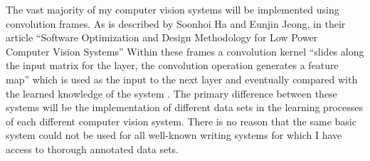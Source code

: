 \documentclass[12pt]{article}
\begin{document}
The vast majority of my computer vision systems will be implemented using convolution frames. As is described by Soonhoi Ha and Eunjin Jeong, in their article “Software Optimization and Design Methodology for Low Power Computer Vision Systems” Within these frames a convolution kernel “slides along the input matrix for the layer, the convolution operation generates a feature map” which is used as the input to the next layer and eventually compared with the learned knowledge of the system \cite{10.1145/3687310}. The primary difference between these systems will be the implementation of different data sets in the learning processes of each different computer vision system. There is no reason that the same basic system could not be used for all well-known writing systems for which I have access to thorough annotated data sets.
\end{document}

